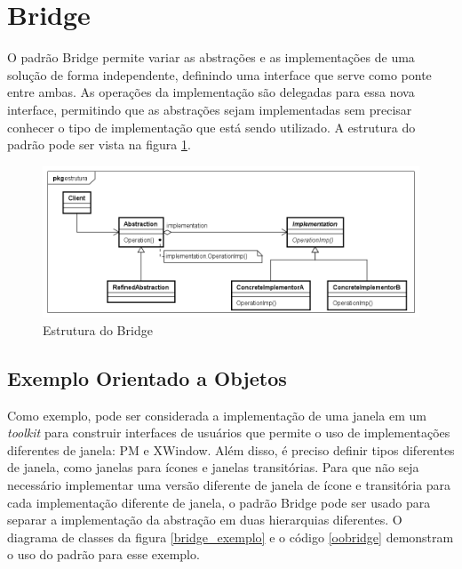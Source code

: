 \section{Bridge}

O padrão Bridge permite variar as abstrações e as 
implementações de uma solução de forma independente, 
definindo uma interface que serve como ponte entre ambas. 
As operações da implementação são delegadas para essa 
nova interface, permitindo que as abstrações sejam 
implementadas sem precisar conhecer o tipo de 
implementação que está sendo utilizado. A estrutura do 
padrão pode ser vista na figura \ref{bridge_struct}.

\begin{figure}[htb]
	\caption{\label{bridge_struct}Estrutura do Bridge}
	\begin{center}
	    \includegraphics[scale=0.5]{5_padroes-contexto-funcional/5.2_estruturais/5.2.2_bridge/bridge_estrutura.png}
	\end{center}
\end{figure}

\subsection*{Exemplo Orientado a Objetos}

Como exemplo, pode ser considerada a implementação de 
uma janela em um \textit{toolkit} para construir interfaces 
de usuários que permite o uso de implementações diferentes 
de janela: PM e XWindow. Além disso, é preciso definir tipos 
diferentes de janela, como janelas para ícones e janelas 
transitórias. Para que não seja necessário implementar 
uma versão diferente de janela de ícone e transitória 
para cada implementação diferente de janela, o padrão 
Bridge pode ser usado para separar a implementação 
da abstração em duas hierarquias diferentes. O diagrama 
de classes da figura \ref{bridge_exemplo} e o código 
\ref{oobridge} demonstram o uso do padrão para esse 
exemplo.

